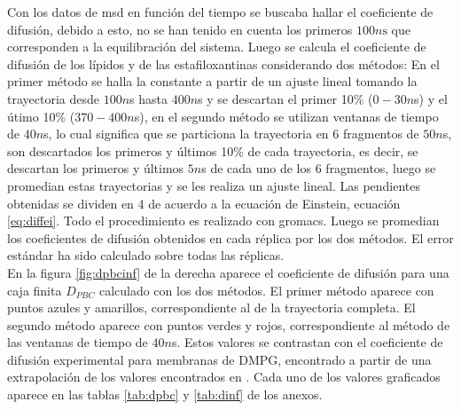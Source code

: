 Con los datos de msd en funci\'{o}n del tiempo se buscaba hallar el coeficiente de difusi\'{o}n, debido a esto, no se han tenido en cuenta los primeros $100n\mathrm{s}$ que corresponden a la equilibraci\'{o}n del sistema. Luego se calcula el coeficiente de difusi\'{o}n de los l\'{i}pidos y de las estafiloxantinas considerando dos m\'{e}todos: En el primer m\'{e}todo se halla la constante a partir de un ajuste lineal tomando la trayectoria desde $100n$s hasta $400n$s y se descartan el primer 10\% ($0-30n$s) y el \'{u}timo 10\% ($370-400n$s), en el segundo m\'{e}todo se utilizan ventanas de tiempo de $40n$s, lo cual significa que se particiona la trayectoria en 6 fragmentos de $50n$s, son descartados los primeros y \'{u}ltimos 10\% de cada trayectoria, es decir, se descartan los primeros  y \'{u}ltimos $5n$s de cada uno de los 6 fragmentos, luego se promedian estas trayectorias y se les realiza un ajuste lineal. Las pendientes obtenidas se dividen en 4 de acuerdo a la ecuaci\'{o}n de Einstein, ecuaci\'{o}n \eqref{eq:diffei}. Todo el procedimiento es realizado con gromacs. Luego se promedian los coeficientes de difusi\'{o}n obtenidos en cada r\'{e}plica por los dos m\'{e}todos. El error est\'{a}ndar ha sido calculado sobre todas las r\'{e}plicas.\\

En la figura \ref{fig:dpbcinf} de la derecha aparece el coeficiente de difusi\'{o}n para una caja finita $D_{PBC}$ calculado con los dos m\'{e}todos. El primer m\'{e}todo aparece con puntos azules y amarillos, correspondiente al de la trayectoria completa. El segundo m\'{e}todo aparece con puntos verdes y rojos, correspondiente al m\'{e}todo de las ventanas de tiempo de $40n$s. Estos valores se contrastan con el coeficiente de difusi\'{o}n experimental para membranas de DMPG, encontrado a partir de una extrapolaci\'{o}n de los valores encontrados en \cite{Bag2014TemperatureSpectroscopy}. Cada uno de los valores graficados aparece en las tablas \ref{tab:dpbc} y \ref{tab:dinf} de los anexos.\\

